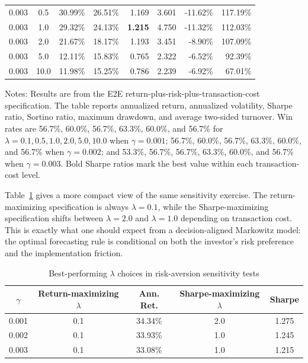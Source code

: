 \documentclass[11pt]{article}
\begin{document}
\begin{table}[H]
{\begin{tabular}{ccrrrrrr}
0.003 & 0.5  & 30.99\% & 26.51\% & 1.169 & 3.601 & -11.62\% & 117.19\% \\
0.003 & 1.0  & 29.32\% & 24.13\% & \textbf{1.215} & 4.750 & -11.32\% & 112.03\% \\
0.003 & 2.0  & 21.67\% & 18.17\% & 1.193 & 3.451 & -8.90\% & 107.09\% \\
0.003 & 5.0  & 12.11\% & 15.83\% & 0.765 & 2.322 & -6.52\% & 92.39\% \\
0.003 & 10.0 & 11.98\% & 15.25\% & 0.786 & 2.239 & -6.92\% & 67.01\% \\
\bottomrule
\end{tabular}}
\begin{flushleft}
\small
Notes: Results are from the E2E return-plus-risk-plus-transaction-cost specification. The table reports annualized return, annualized volatility, Sharpe ratio, Sortino ratio, maximum drawdown, and average two-sided turnover. Win rates are 56.7\%, 60.0\%, 56.7\%, 63.3\%, 60.0\%, and 56.7\% for $\lambda=0.1,0.5,1.0,2.0,5.0,10.0$ when $\gamma=0.001$; 56.7\%, 60.0\%, 56.7\%, 63.3\%, 60.0\%, and 56.7\% when $\gamma=0.002$; and 53.3\%, 56.7\%, 56.7\%, 63.3\%, 60.0\%, and 56.7\% when $\gamma=0.003$. Bold Sharpe ratios mark the best value within each transaction-cost level.
\end{flushleft}
\end{table}

Table~\ref{tab:lambda_best} gives a more compact view of the same sensitivity exercise. The return-maximizing specification is always $\lambda=0.1$, while the Sharpe-maximizing specification shifts between $\lambda=2.0$ and $\lambda=1.0$ depending on transaction cost. This is exactly what one should expect from a decision-aligned Markowitz model: the optimal forecasting rule is conditional on both the investor's risk preference and the implementation friction.

\begin{table}[H]
\centering
\caption{Best-performing $\lambda$ choices in risk-aversion sensitivity tests}
\label{tab:lambda_best}
\begin{tabular}{ccccc}
\toprule
$\gamma$ & Return-maximizing $\lambda$ & Ann. Ret. & Sharpe-maximizing $\lambda$ & Sharpe \\
\midrule
0.001 & 0.1 & 34.34\% & 2.0 & 1.275 \\
0.002 & 0.1 & 33.93\% & 1.0 & 1.245 \\
0.003 & 0.1 & 33.08\% & 1.0 & 1.215 \\
\bottomrule
\end{tabular}
\end{table}
\end{document}

